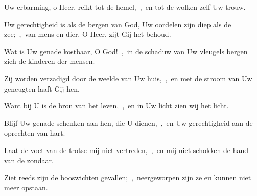 \documentclass[12pt,twoside,a5paper]{article}
\begin{document}
\begin{halfparskip}
  Uw erbarming, o Heer, reikt tot de hemel,~\sep\ en tot de wolken zelf Uw trouw.

  Uw gerechtigheid is als de bergen van God, Uw oordelen zijn diep als de zee;~\sep\ van mens en dier, O Heer, zijt Gij het behoud.

  Wat is Uw genade kostbaar, O God!~\sep\ in de schaduw van Uw vleugels bergen zich de kinderen der mensen.

  Zij worden verzadigd door de weelde van Uw huis,~\sep\ en met de stroom van Uw geneugten laaft Gij hen.

  Want bij U is de bron van het leven,~\sep\ en in Uw licht zien wij het licht.

  Blijf Uw genade schenken aan hen, die U dienen,~\sep\ en Uw gerechtigheid aan de oprechten van hart.

  Laat de voet van de trotse mij niet vertreden,~\sep\ en mij niet schokken de hand van de zondaar.

  Ziet reeds zijn de booswichten gevallen;~\sep\ neergeworpen zijn ze en kunnen niet meer opstaan.
\end{halfparskip}
\end{document}
